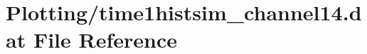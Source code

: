 \hypertarget{Plotting_2time1histsim__channel14_8dat}{}\section{Plotting/time1histsim\+\_\+channel14.dat File Reference}
\label{Plotting_2time1histsim__channel14_8dat}
